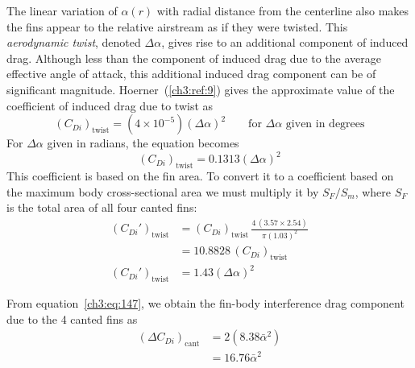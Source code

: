 The linear variation of $\alpha(r)$ with radial distance from the centerline also makes the fins
appear to the relative airstream as if they were twisted. This \emph{aerodynamic twist}, denoted
$\Delta\alpha$, gives rise to an additional component of induced drag. Although less than the
component of induced drag due to the average effective angle of attack, this additional induced
drag component can be of significant magnitude. Hoerner~(\ref{ch3:ref:9}) gives the approximate
value of the coefficient of induced drag due to twist as
\begin{equation*}
(C_{Di})_{\mathrm{twist}} = (4 \times 10^{-5})(\Delta\alpha)^2
\qquad \text{for $\Delta\alpha$ given in degrees}
\end{equation*}
For $\Delta\alpha$ given in radians, the equation becomes
\begin{equation*}
(C_{Di})_{\mathrm{twist}} = 0.1313(\Delta\alpha)^2
\end{equation*}
This coefficient is based on the fin area. To convert it to a coefficient based on the maximum body
cross-sectional area we must multiply it by $S_F/S_m$, where $S_F$ is the total area of all four
canted fins:
\begin{align*}
(C_{Di}')_{\mathrm{twist}} &= (C_{Di})_{\mathrm{twist}}\,\frac{4\,(3.57 \times 2.54)}{\pi(1.03)^2}\\
&= 10.8828\,(C_{Di})_{\mathrm{twist}}\\
(C_{Di}')_{\mathrm{twist}} &= 1.43(\Delta\alpha)^2 \tag{155$'$}\label{ch3:eq:n155}
\end{align*}

From equation~\eqref{ch3:eq:147}, we obtain the fin-body interference drag component due to the 4
canted fins as
\begin{align*}
(\Delta C_{Di})_{\mathrm{cant}} &= 2(8.38\bar{\alpha}^2)\\
&= 16.76\bar{\alpha}^2
\end{align*}

